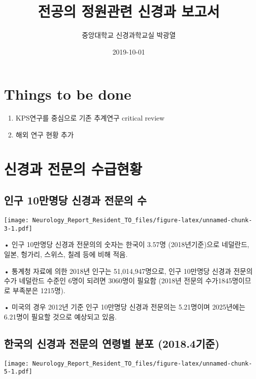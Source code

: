 \documentclass[]{book}
\title{전공의 정원관련 신경과 보고서}
\author{중앙대학교 신경과학교실 박광열}
\date{2019-10-01}
\providecommand{\tightlist}{%
  \setlength{\itemsep}{0pt}\setlength{\parskip}{0pt}}
\begin{document}
\maketitle

{
\setcounter{tocdepth}{1}
\tableofcontents
}
\hypertarget{things-to-be-done}{%
\chapter*{Things to be done}\label{things-to-be-done}}

\begin{enumerate}
\def\labelenumi{\arabic{enumi}.}
\tightlist
\item
  KPS연구를 중심으로 기존 추계연구 critical review
\item
  해외 연구 현황 추가
\end{enumerate}

\hypertarget{DemandSupplyNeurologist}{%
\chapter{신경과 전문의 수급현황}\label{DemandSupplyNeurologist}}

\hypertarget{section}{%
\section{인구 10만명당 신경과 전문의 수}\label{section}}

\texttt{[image: Neurology\_Report\_Resident\_TO\_files/figure-latex/unnamed-chunk-3-1.pdf]}

• 인구 10만명당 신경과 전문의의 숫자는 한국이 3.57명 (2018년기준)으로 네덜란드, 일본, 헝가리, 스위스, 칠레 등에 비해 적음.

• 통계청 자료에 의한 2018년 인구는 51,014,947명으로, 인구 10만명당 신경과 전문의 수가 네덜란드 수준인 6명이 되려면 3060명이 필요함 (2018년 전문의 수가1845명이므로 부족분은 1215명).

• 미국의 경우 2012년 기준 인구 10만명당 신경과 전문의는 5.21명이며 2025년에는 6.21명이 필요할 것으로 예상되고 있음.

\hypertarget{section-1}{%
\section{한국의 신경과 전문의 연령별 분포 (2018.4기준)}\label{section-1}}

\texttt{[image: Neurology\_Report\_Resident\_TO\_files/figure-latex/unnamed-chunk-5-1.pdf]}
\end{document}
